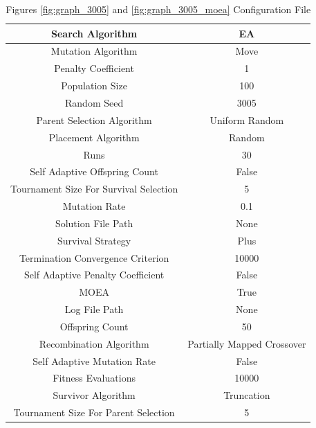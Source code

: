 \documentclass{standalone}
\begin{document}
\begin{table}[!htb]
	\centering
	\caption{Figures \ref{fig:graph_3005} and \ref{fig:graph_3005_moea} Configuration File}
	\label{tab:graph_3005}
	\begin{tabular}{| c | c |}
		\hline
		Search Algorithm		& EA		 \\
		\hline
		Mutation Algorithm		& Move		 \\
		\hline
		Penalty Coefficient		& 1		 \\
		\hline
		Population Size		& 100		 \\
		\hline
		Random Seed		& 3005		 \\
		\hline
		Parent Selection Algorithm		& Uniform Random		 \\
		\hline
		Placement Algorithm		& Random		 \\
		\hline
		Runs		& 30		 \\
		\hline
		Self Adaptive Offspring Count		& False		 \\
		\hline
		Tournament Size For Survival Selection		& 5		 \\
		\hline
		Mutation Rate		& 0.1		 \\
		\hline
		Solution File Path		& None		 \\
		\hline
		Survival Strategy		& Plus		 \\
		\hline
		Termination Convergence Criterion		& 10000		 \\
		\hline
		Self Adaptive Penalty Coefficient		& False		 \\
		\hline
		MOEA		& True		 \\
		\hline
		Log File Path		& None		 \\
		\hline
		Offspring Count		& 50		 \\
		\hline
		Recombination Algorithm		& Partially Mapped Crossover		 \\
		\hline
		Self Adaptive Mutation Rate		& False		 \\
		\hline
		Fitness Evaluations		& 10000		 \\
		\hline
		Survivor Algorithm		& Truncation		 \\
		\hline
		Tournament Size For Parent Selection		& 5		 \\
		\hline
	\end{tabular}
\end{table}
\end{document}
